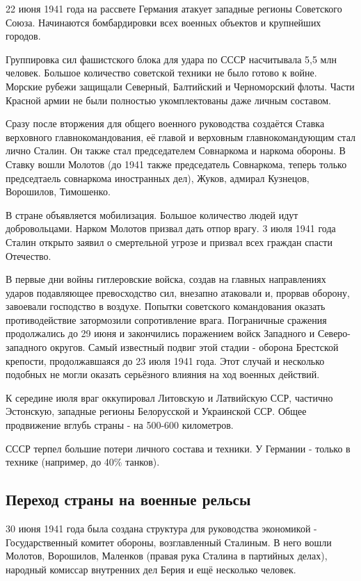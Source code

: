22 июня 1941 года на рассвете Германия атакует западные регионы Советского Союза. Начинаются бомбардировки всех военных объектов и крупнейших городов.

Группировка сил фашистского блока для удара по СССР насчитывала 5,5 млн человек. Большое количество советской техники не было готово к войне. Морские рубежи защищали Северный, Балтийский и Черноморский флоты. Части Красной армии не были полностью укомплектованы даже личным составом.

Сразу после вторжения для общего военного руководства создаётся Ставка верховного главнокомандования, её главой и верховным главнокомандующим стал лично Сталин. Он также стал председателем Совнаркома и наркома обороны. В Ставку вошли Молотов (до 1941 также председатель Совнаркома, теперь только председтаель совнаркома иностранных дел), Жуков, адмирал Кузнецов, Ворошилов, Тимошенко.

В стране объявляется мобилизация. Большое количество людей идут добровольцами. Нарком Молотов призвал дать отпор врагу. 3 июля 1941 года Сталин открыто заявил о смертельной угрозе и призвал всех граждан спасти Отечество.

В первые дни войны гитлеровские войска, создав на главных направлениях ударов подавляющее превосходство сил, внезапно атаковали и, прорвав оборону, завоевали господство в воздухе. Попытки советского командования оказать противодействие затормозили сопротивление врага. Пограничные сражения продолжались до 29 июня и закончились поражением войск Западного и Северо-западного округов. Самый известный подвиг этой стадии - оборона Брестской крепости, продолжавшаяся до 23 июля 1941 года. Этот случай и несколько подобных не могли оказать серьёзного влияния на ход военных действий.

К середине июля враг оккупировал Литовскую и Латвийскую ССР, частично Эстонскую, западные регионы Белорусской и Украинской ССР. Общее продвижение вглубь страны - на 500-600 километров.

СССР терпел большие потери личного состава и техники. У Германии - только в технике (например, до 40\% танков).


\subsection{Переход страны на военные рельсы}
30 июня 1941 года была создана структура для руководства экономикой - Государственный комитет обороны, возглавленный Сталиным. В него вошли Молотов, Ворошилов, Маленков (правая рука Сталина в партийных делах), народный комиссар внутренних дел Берия и ещё несколько человек.

